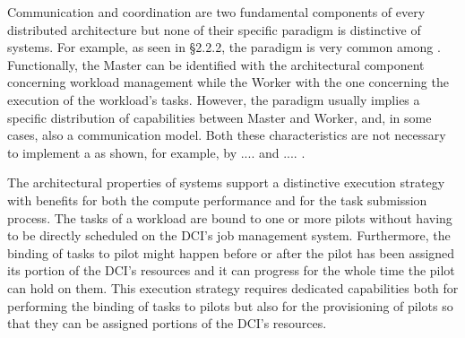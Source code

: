 \documentclass{sig-alternate}
\begin{document}
Communication and coordination are two fundamental components of every distributed architecture but none of their specific paradigm is distinctive of \pilotjob systems.  For example, as seen in \S2.2.2, the \MW paradigm is very common among \pilotjobs. Functionally, the Master can be  identified with the architectural component concerning workload management while the Worker with the one concerning the execution of the workload's tasks. However, the \MW paradigm usually implies a specific distribution of capabilities between Master and Worker, and, in some cases, also a communication model. Both these characteristics are not necessary to implement a \pilotjob as shown, for example, by .... and .... . 

 

The architectural properties of \pilotjob systems support a distinctive execution strategy with benefits for both the compute performance and for the task submission process. The tasks of a workload are bound to one or more pilots without having to be directly scheduled on the DCI's job management system. Furthermore, the binding of tasks to pilot might happen before or after the pilot has been assigned its portion of the DCI's resources and it can progress for the whole time the pilot can hold on them. This execution strategy requires dedicated capabilities both for performing the binding of tasks to pilots but also for the provisioning of pilots so that they can be assigned portions of the DCI's resources.

 
\end{document}
